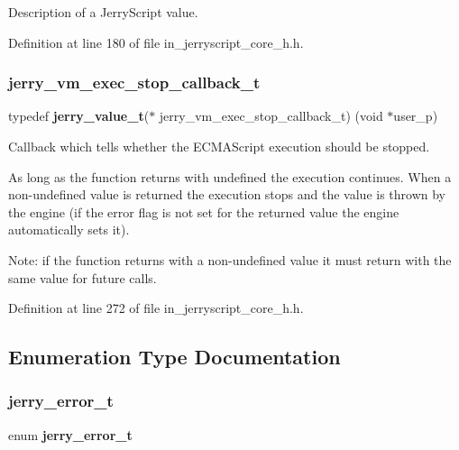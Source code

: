 Description of a Jerry\+Script value. 

Definition at line 180 of file in\+\_\+jerryscript\+\_\+core\+\_\+h.\+h.

\mbox{\label{group___core_gadc04e5b3a7359649726b537f5f178017}} 
\subsubsection{jerry\_vm\_exec\_stop\_callback\_t}
{\footnotesize\ttfamily typedef \textbf{ jerry\+\_\+value\+\_\+t}($\ast$ jerry\+\_\+vm\+\_\+exec\+\_\+stop\+\_\+callback\+\_\+t) (void $\ast$user\+\_\+p)}

Callback which tells whether the E\+C\+M\+A\+Script execution should be stopped.

As long as the function returns with undefined the execution continues. When a non-\/undefined value is returned the execution stops and the value is thrown by the engine (if the error flag is not set for the returned value the engine automatically sets it).

Note\+: if the function returns with a non-\/undefined value it must return with the same value for future calls. 

Definition at line 272 of file in\+\_\+jerryscript\+\_\+core\+\_\+h.\+h.



\subsection{Enumeration Type Documentation}
\mbox{\label{group___core_ga223d3cab9ac7326d5c0f10c671ae4629}} 
\subsubsection{jerry\_error\_t}
{\footnotesize\ttfamily enum \textbf{ jerry\+\_\+error\+\_\+t}}

